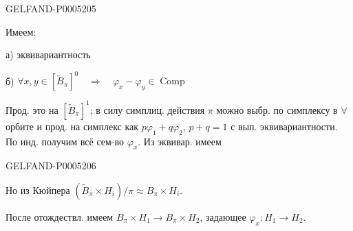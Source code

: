 \begin{GelfandAdjacentEvidence}{GELFAND-P000520}{5}

Имеем:

а) эквивариантность

б) $\forall x,y\in[\widetilde B_\pi]^0\quad\Rightarrow\quad
\varphi_x-\varphi_y\in\operatorname{Comp}$

Прод. это на $[\widetilde B_\pi]^1$; в силу симплиц. действия $\pi$ можно выбр. по симплексу в $\forall$ орбите и прод. на симплекс как
$p\varphi_1+q\varphi_2$, $p+q=1$ с вып. эквивариантности.
По инд. получим всё сем-во $\varphi_x$. Из эквивар. имеем
\end{GelfandAdjacentEvidence}
\begin{GelfandAdjacentEvidence}{GELFAND-P000520}{6}


Но из Кюйпера $(\widetilde B_\pi\times H_i)/\pi\approx B_\pi\times H_i$.
\end{GelfandAdjacentEvidence}

После отождествл. имеем $B_\pi\times H_1\to B_\pi\times H_2$,
задающее $\varphi_x:H_1\to H_2$.


